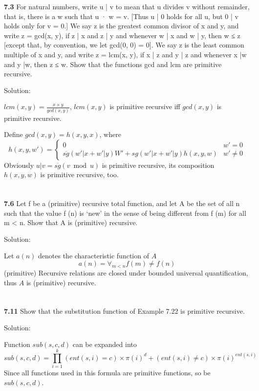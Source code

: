 \documentclass{ctexart}
\begin{document}
\textbf{7.3} For natural numbers, write u | v to mean that u divides v without remainder,
that is, there is a w such that u · w = v. [Thus u | 0 holds for all u, but 0 | v
holds only for v = 0.] We say z is the greatest common divisor of x and y, and
write z = gcd(x, y), if z | x and z | y and whenever w | x and w | y, then w ≤ z
[except that, by convention, we let gcd(0, 0) = 0]. We say z is the least common
multiple of x and y, and write z = lcm(x, y), if x | z and y | z and whenever
x |w and y |w, then z ≤ w. Show that the functions gcd and lcm are primitive
recursive.

Solution:

$lcm(x, y) = \frac{x \times y}{gcd(x, y)}$, $lcm(x, y)$ is primitive recursive iff
$gcd(x, y)$ is primitive recursive.

Define $gcd(x, y) = h(x, y, x)$, where
$$
h(x, y, w') = \begin{cases}
0 & w' = 0 \\
\overline{sg}(w' | x + w' | y) W' + sg(w' | x + w' | y) h(x, y, w) & w' \not= 0
\end{cases}
$$
Obviously $u | v = \overline{sg}(v \bmod u)$ is primitive recursive,
its composition $h(x, y, w)$ is primitive recursive, too.

\section*{}

\textbf{7.6} Let f be a (primitive) recursive total function, and let A be the set of all n such
that the value f (n) is ‘new’ in the sense of being different from f (m) for all
m < n. Show that A is (primitive) recursive.

Solution:

Let $a(n)$ denotes the characteristic function of $A$
$$
a(n) = \forall_{m < n} f(m) \not= f(n)
$$
(primitive) Recursive relations are closed under bounded universal quantification, thus $A$ is
(primitive) recursive.

\section*{}

\textbf{7.11} Show that the substitution function of Example 7.22 is primitive recursive.

Solution:

Function $sub(s, c, d)$ can be expanded into
$$
sub(s, c, d) = \prod_{i=1}^{k} (ent(s, i) = c) \times \pi(i)^d
	+ (ent(s, i) \not= c) \times \pi(i)^{ent(s, i)}
$$
Since all functions used in this formula are primitive functions, so be $sub(s, c, d)$.
\end{document}
